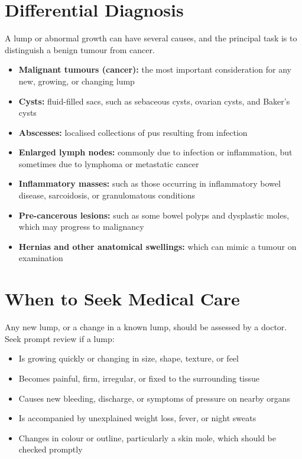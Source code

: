 \section*{Differential Diagnosis}
A lump or abnormal growth can have several causes, and the principal task is to distinguish a benign tumour from cancer.

\begin{itemize}
    \item \textbf{Malignant tumours (cancer):} the most important consideration for any new, growing, or changing lump
    \item \textbf{Cysts:} fluid-filled sacs, such as sebaceous cysts, ovarian cysts, and Baker's cysts
    \item \textbf{Abscesses:} localised collections of pus resulting from infection
    \item \textbf{Enlarged lymph nodes:} commonly due to infection or inflammation, but sometimes due to lymphoma or metastatic cancer
    \item \textbf{Inflammatory masses:} such as those occurring in inflammatory bowel disease, sarcoidosis, or granulomatous conditions
    \item \textbf{Pre-cancerous lesions:} such as some bowel polyps and dysplastic moles, which may progress to malignancy
    \item \textbf{Hernias and other anatomical swellings:} which can mimic a tumour on examination
\end{itemize}

\section*{When to Seek Medical Care}
Any new lump, or a change in a known lump, should be assessed by a doctor. Seek prompt review if a lump:

\begin{itemize}
    \item Is growing quickly or changing in size, shape, texture, or feel
    \item Becomes painful, firm, irregular, or fixed to the surrounding tissue
    \item Causes new bleeding, discharge, or symptoms of pressure on nearby organs
    \item Is accompanied by unexplained weight loss, fever, or night sweats
    \item Changes in colour or outline, particularly a skin mole, which should be checked promptly
\end{itemize}

